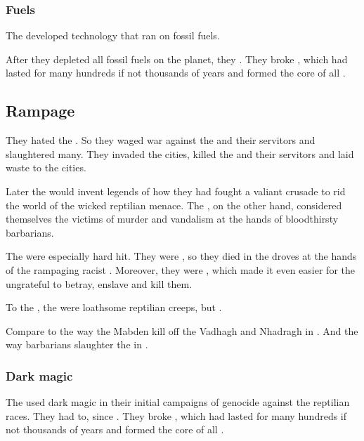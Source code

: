 \subsubsection{Fuels}
The \aryothim developed technology that ran on fossil fuels. 

After they depleted all fossil fuels on the planet, they . 
They broke , which had lasted for many hundreds if not thousands of years and formed the core of all . 









\subsection{Rampage}
They hated the . 
So they waged war against the \quiljaaran{} and their servitors and slaughtered many. 
They invaded the \quiljaaran{} cities, killed the \quiljaaran{} and their servitors and laid waste to the cities. 

Later the \aryothim{} would invent legends of how they had fought a valiant crusade to rid the world of the wicked reptilian menace. 
The \quiljaaran, on the other hand, considered themselves the victims of murder and vandalism at the hands of bloodthirsty barbarians. 

The \loculs{} were especially hard hit. 
They were , so they died in the droves at the hands of the rampaging racist \nephilim. 
Moreover, they were , which made it even easier for the ungrateful \nephilim{} to betray, enslave and kill them. 

To the \nephilim, the \loculs{} were loathsome reptilian creeps, but . 

Compare to the way the Mabden kill off the Vadhagh and Nhadragh in \cite{MichaelMoorcock:Corum}. 
And the way barbarians slaughter the  in \cite{TadWilliams:MemorySorrowandThorn}. 





\subsubsection{Dark magic}
The \aryothim used dark magic in their initial campaigns of genocide against the reptilian races.
They had to, since . 
They broke , which had lasted for many hundreds if not thousands of years and formed the core of all . 

